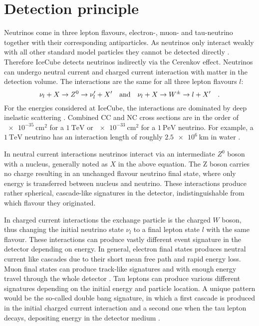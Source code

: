 \section{Detection principle}
Neutrinos come in three lepton flavours, electron-, muon- and tau-neutrino together with their corresponding antiparticles.
As neutrinos only interact weakly with all other standard model particles they cannot be detected directly .
Therefore IceCube detects neutrinos indirectly via the Cerenkov effect.
Neutrinos can undergo neutral current and charged current interaction with matter in the detection volume.
The interactions are the same for all three lepton flavours $l$:
\begin{equation}
  \nu_l + X \rightarrow Z^0 \rightarrow \nu'_l + X'
  \quad\text{and}\quad
  \nu_l + X \rightarrow W^{\pm} \rightarrow l + X'
  \quad\text{.}
\end{equation}
For the energies considered at IceCube, the interactions are dominated by deep inelastic scattering .
Combined CC and NC cross sections are in the order of $\SI{e-35}{\cm\squared}$ for a $\SI{1}{\TeV}$ or $\SI{e-33}{\cm\squared}$ for a $\SI{1}{\peta\eV}$ neutrino.
For example, a $\SI{1}{\TeV}$ neutrino has an interaction length of roughly $\SI{2.5e6}{\km}$ in water .

In neutral current interactions neutrinos interact via an intermediate $Z^0$ boson with a nucleus, generally noted as $X$ in the above equation.
The Z boson carries no charge resulting in an unchanged flavour neutrino final state, where only energy is transferred between nucleus and neutrino.
These interactions produce rather spherical, cascade-like signatures in the detector, indistinguishable from which flavour they originated.

In charged current interactions the exchange particle is the charged $W$ boson, thus changing the initial neutrino state $\nu_l$ to a final lepton state $l$ with the same flavour.
These interactions can produce vastly different event signature in the detector depending on energy.
In general, electron final states produces neutral current like cascades due to their short mean free path and rapid energy loss.
Muon final states can produce track-like signatures and with enough energy travel through the whole detector .
Tau leptons can produce various different signatures depending on the initial energy and particle location.
A unique pattern would be the so-called double bang signature, in which a first cascade is produced in the initial charged current interaction and a second one when the tau lepton decays, depositing energy in the detector medium .

